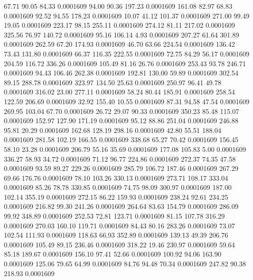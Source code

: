   67.71   90.05   84.33   0.0001609
  94.00   90.36  197.23   0.0001609
 161.08   82.97   68.83   0.0001609
  92.52   94.55  178.23   0.0001609
  10.07   41.12  101.37   0.0001609
 271.00   99.49   19.05   0.0001609
 223.17   98.15  255.11   0.0001609
 274.12   81.11  217.02   0.0001609
 325.56   76.97  140.72   0.0001609
  95.16  106.14    4.93   0.0001609
 207.27   61.64  301.89   0.0001609
 262.59   67.20  174.93   0.0001609
  46.70   63.66  224.54   0.0001609
 136.42   73.43  131.80   0.0001609
  66.37  116.35  222.55   0.0001609
  72.75   84.29   56.17   0.0001609
 204.59  116.72  336.26   0.0001609
 105.49   81.16   26.76   0.0001609
 253.43   93.78  246.71   0.0001609
  94.43  106.46  262.38   0.0001609
 192.81  130.00   59.89   0.0001609
 302.54   89.15  288.78   0.0001609
 323.97  134.50   25.63   0.0001609
 250.97   96.41   49.78   0.0001609
 316.02   23.00  277.11   0.0001609
  58.24   80.44  185.91   0.0001609
 258.54  122.59  206.69   0.0001609
  32.92  155.40   10.55   0.0001609
  87.31   94.58   47.54   0.0001609
 269.95  103.04   67.70   0.0001609
  26.72   29.07   90.33   0.0001609
 350.23   85.48  115.07   0.0001609
 152.97  127.90  171.19   0.0001609
  95.12   88.86  251.04   0.0001609
 246.88   95.81   20.29   0.0001609
 162.68  128.19  298.16   0.0001609
  42.80   55.51  188.04   0.0001609
 281.58  102.19  166.55   0.0001609
 338.68   65.27   70.42   0.0001609
 156.45   58.10   23.28   0.0001609
 206.79   55.16   35.69   0.0001609
 177.08  105.83    5.00   0.0001609
 336.27   58.93   34.72   0.0001609
  71.12   96.77  224.86   0.0001609
 272.37   74.35   47.58   0.0001609
  93.59   89.27  229.26   0.0001609
 285.79  106.72  187.46   0.0001609
 267.29   69.66  176.76   0.0001609
  78.10  103.26  330.13   0.0001609
 273.71  108.17  333.04   0.0001609
  85.26   78.78  330.85   0.0001609
  74.75   98.09  300.97   0.0001609
 187.00  102.14  355.19   0.0001609
 272.15   86.22  159.93   0.0001609
 238.24   92.61  234.25   0.0001609
 216.82   99.30  241.26   0.0001609
 264.64   83.63  154.79   0.0001609
 286.09   99.92  348.89   0.0001609
 252.53   72.81  123.71   0.0001609
  81.15  107.78  316.29   0.0001609
 270.03  160.10  119.71   0.0001609
  84.43   80.16  283.26   0.0001609
  73.07  102.54  111.93   0.0001609
 118.63   66.93  352.89   0.0001609
 139.13   49.39  206.76   0.0001609
 105.49   89.15  236.46   0.0001609
 318.22   19.46  230.97   0.0001609
  59.64   85.18  189.67   0.0001609
 156.10   97.41   52.66   0.0001609
 100.92   94.06  163.90   0.0001609
 125.06   79.65   64.99   0.0001609
  84.76   94.48   70.34   0.0001609
 247.82   90.38  218.93   0.0001609
